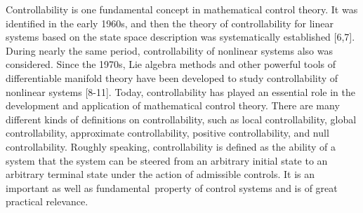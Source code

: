 \documentclass[journal,a4paper,12pt,onecolumn]{IEEEtran}
\begin{document}
Controllability is one fundamental concept in mathematical control theory.
It was identified in the early 1960s, and then the theory of controllability
for linear systems based on the state space description was systematically
established [6,7]. During nearly the same period, controllability of
nonlinear systems also was considered. Since the 1970s, Lie algebra methods
and other powerful tools of differentiable manifold theory have been
developed to study controllability of nonlinear systems [8-11]. Today,
controllability has played an essential role in the development and
application of mathematical control theory. There are many different kinds
of definitions on controllability, such as local controllability, global
controllability, approximate controllability, positive controllability, and
null controllability. Roughly speaking, controllability is defined as the
ability of a system that the system can be steered from an arbitrary initial
state to an arbitrary terminal state under the action of admissible
controls. It is an important as well as fundamental\ property of control
systems and is of great practical relevance.
\end{document}
